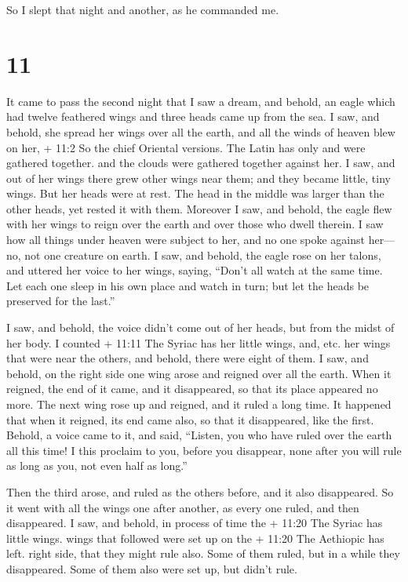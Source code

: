 So I slept that night and another, as he commanded me.

\hypertarget{section-10}{%
\section{11}\label{section-10}}

 It came to pass the second night that I saw a dream, and
behold, an eagle which had twelve feathered wings and three heads came
up from the sea.  I saw, and behold, she spread her wings
over all the earth, and all the winds of heaven blew on her, + 11:2 So
the chief Oriental versions. The Latin has only and were gathered
together. and the clouds were gathered together against her.
 I saw, and out of her wings there grew other wings near
them; and they became little, tiny wings.  But her heads
were at rest. The head in the middle was larger than the other heads,
yet rested it with them.  Moreover I saw, and behold, the
eagle flew with her wings to reign over the earth and over those who
dwell therein.  I saw how all things under heaven were
subject to her, and no one spoke against her---no, not one creature on
earth.  I saw, and behold, the eagle rose on her talons, and
uttered her voice to her wings, saying,  ``Don't all watch
at the same time. Let each one sleep in his own place and watch in turn;
 but let the heads be preserved for the last.''

 I saw, and behold, the voice didn't come out of her heads,
but from the midst of her body.  I counted + 11:11 The
Syriac has her little wings, and, etc. her wings that were near the
others, and behold, there were eight of them.  I saw, and
behold, on the right side one wing arose and reigned over all the earth.
 When it reigned, the end of it came, and it disappeared,
so that its place appeared no more. The next wing rose up and reigned,
and it ruled a long time.  It happened that when it
reigned, its end came also, so that it disappeared, like the first.
 Behold, a voice came to it, and said, 
``Listen, you who have ruled over the earth all this time! I this
proclaim to you, before you disappear,  none after you will
rule as long as you, not even half as long.''

 Then the third arose, and ruled as the others before, and
it also disappeared.  So it went with all the wings one
after another, as every one ruled, and then disappeared.  I
saw, and behold, in process of time the + 11:20 The Syriac has little
wings. wings that followed were set up on the + 11:20 The Aethiopic has
left. right side, that they might rule also. Some of them ruled, but in
a while they disappeared.  Some of them also were set up,
but didn't rule.

